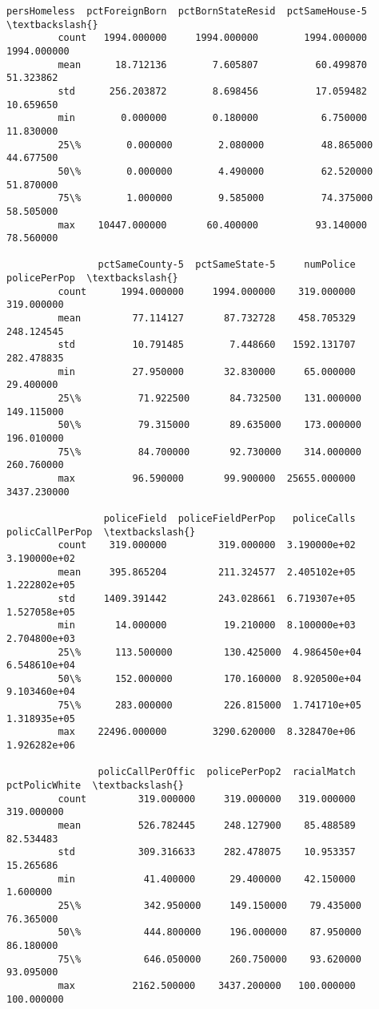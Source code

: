 \documentclass[11pt]{llncs}
\begin{document}
\begin{Verbatim}[commandchars=\\\{\}]
                persHomeless  pctForeignBorn  pctBornStateResid  pctSameHouse-5  \textbackslash{}
         count   1994.000000     1994.000000        1994.000000     1994.000000   
         mean      18.712136        7.605807          60.499870       51.323862   
         std      256.203872        8.698456          17.059482       10.659650   
         min        0.000000        0.180000           6.750000       11.830000   
         25\%        0.000000        2.080000          48.865000       44.677500   
         50\%        0.000000        4.490000          62.520000       51.870000   
         75\%        1.000000        9.585000          74.375000       58.505000   
         max    10447.000000       60.400000          93.140000       78.560000   
         
                pctSameCounty-5  pctSameState-5     numPolice  policePerPop  \textbackslash{}
         count      1994.000000     1994.000000    319.000000    319.000000   
         mean         77.114127       87.732728    458.705329    248.124545   
         std          10.791485        7.448660   1592.131707    282.478835   
         min          27.950000       32.830000     65.000000     29.400000   
         25\%          71.922500       84.732500    131.000000    149.115000   
         50\%          79.315000       89.635000    173.000000    196.010000   
         75\%          84.700000       92.730000    314.000000    260.760000   
         max          96.590000       99.900000  25655.000000   3437.230000   
         
                 policeField  policeFieldPerPop   policeCalls  policCallPerPop  \textbackslash{}
         count    319.000000         319.000000  3.190000e+02     3.190000e+02   
         mean     395.865204         211.324577  2.405102e+05     1.222802e+05   
         std     1409.391442         243.028661  6.719307e+05     1.527058e+05   
         min       14.000000          19.210000  8.100000e+03     2.704800e+03   
         25\%      113.500000         130.425000  4.986450e+04     6.548610e+04   
         50\%      152.000000         170.160000  8.920500e+04     9.103460e+04   
         75\%      283.000000         226.815000  1.741710e+05     1.318935e+05   
         max    22496.000000        3290.620000  8.328470e+06     1.926282e+06   
         
                policCallPerOffic  policePerPop2  racialMatch  pctPolicWhite  \textbackslash{}
         count         319.000000     319.000000   319.000000     319.000000   
         mean          526.782445     248.127900    85.488589      82.534483   
         std           309.316633     282.478075    10.953357      15.265686   
         min            41.400000      29.400000    42.150000       1.600000   
         25\%           342.950000     149.150000    79.435000      76.365000   
         50\%           444.800000     196.000000    87.950000      86.180000   
         75\%           646.050000     260.750000    93.620000      93.095000   
         max          2162.500000    3437.200000   100.000000     100.000000   
         

\end{Verbatim}
\end{document}
